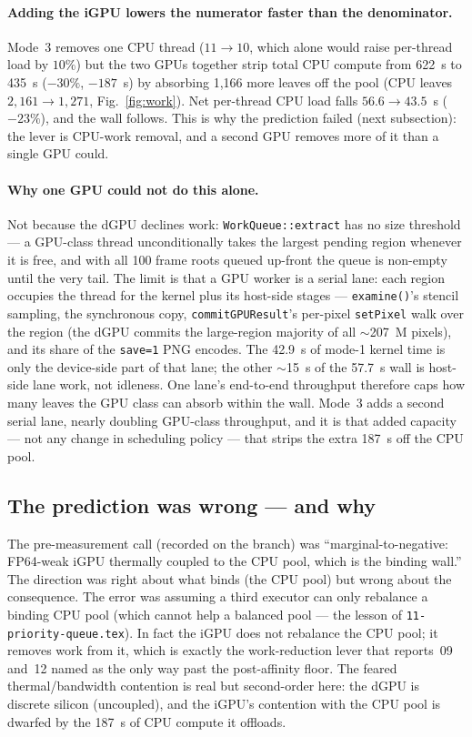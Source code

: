 \documentclass[
	english,
	letterpaper, oneside
]{article}
\begin{document}
\paragraph{Adding the iGPU lowers the numerator faster than the denominator.}
Mode~3 removes one CPU thread ($11\to10$, which alone would raise
per-thread load by $10\%$) but the two GPUs together strip total CPU compute from
622~s to 435~s ($-30\%$, $-187$~s) by absorbing 1{,}166 more leaves off
the pool (CPU leaves $2{,}161\to1{,}271$, Fig.~\ref{fig:work}). Net per-thread CPU
load falls $56.6\to43.5$~s ($-23\%$), and the wall follows. This is why the
prediction failed (next subsection): the lever is CPU-work removal, and a
second GPU removes more of it than a single GPU could.

\paragraph{Why one GPU could not do this alone.} Not because the dGPU declines
work: \texttt{WorkQueue::extract} has no size threshold --- a GPU-class thread
unconditionally takes the largest pending region whenever it is free, and with all
100 frame roots queued up-front the queue is non-empty until the very tail. The
limit is that a GPU worker is a serial lane: each region occupies the thread
for the kernel plus its host-side stages --- \texttt{examine()}'s stencil
sampling, the synchronous copy, \texttt{commitGPUResult}'s per-pixel
\texttt{setPixel} walk over the region (the dGPU commits the large-region majority
of all $\sim$207~M pixels), and its share of the \texttt{save=1} PNG encodes. The
42.9~s of mode-1 kernel time is only the device-side part of that lane; the
other $\sim$15~s of the 57.7~s wall is host-side lane work, not idleness. One lane's
end-to-end throughput therefore caps how many leaves the GPU class can absorb
within the wall. Mode~3 adds a second serial lane, nearly doubling GPU-class
throughput, and it is that added capacity --- not any change in scheduling policy
--- that strips the extra 187~s off the CPU pool.

\subsection{The prediction was wrong --- and why}

The pre-measurement call (recorded on the branch) was ``marginal-to-negative:
FP64-weak iGPU thermally coupled to the CPU pool, which is the binding wall.'' The
direction was right about what binds (the CPU pool) but wrong about the
consequence. The error was assuming a third executor can only rebalance
a binding CPU pool (which cannot help a balanced pool --- the lesson of
\texttt{11-priority-queue.tex}). In fact the iGPU does not rebalance the CPU pool;
it removes work from it, which is exactly the work-reduction lever that
reports~09 and~12 named as the only way past the post-affinity floor. The feared
thermal/bandwidth contention is real but second-order here: the dGPU is discrete
silicon (uncoupled), and the iGPU's contention with the CPU pool is dwarfed by the
187~s of CPU compute it offloads.
\end{document}
